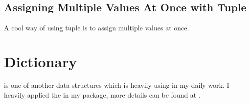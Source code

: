 \documentclass[letterpaper,12pt,english]{sphinxmanual}
\begin{document}
\sphinxAtStartPar
{}
\begin{quote}

\begin{sphinxVerbatim}[commandchars=\\\{\}]
\end{sphinxVerbatim}
\end{quote}


\subsection{Assigning Multiple Values At Once with Tuple}
\label{\detokenize{struct:assigning-multiple-values-at-once-with-tuple}}
\sphinxAtStartPar
A cool way of using tuple is to assign multiple values at once.

\sphinxAtStartPar
{}
\begin{quote}

\begin{sphinxVerbatim}[commandchars=\\\{\}]
    
        
\end{sphinxVerbatim}
\end{quote}


\section{Dictionary}
\label{\detokenize{struct:dictionary}}
\sphinxAtStartPar
{} is one of another data structures which is heavily using in my daily work. I heavily applied the  in my  package, more details can be found at .
\end{document}

